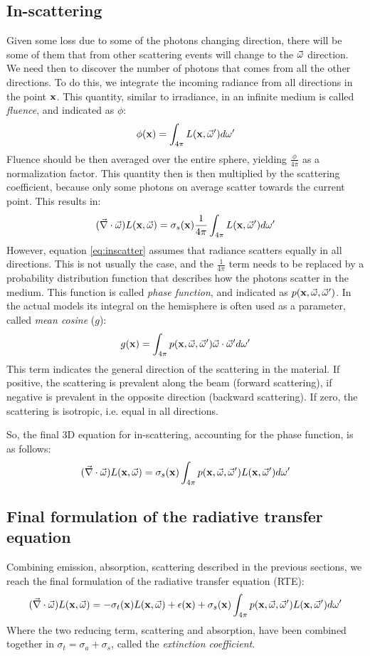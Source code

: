 \subsection{In-scattering}
Given some loss due to some of the photons changing direction, there will be some of them that from other scattering events will change to the $\vec{\omega}$ direction. We need then to discover the number of photons that comes from all the other directions. To do this, we integrate the incoming radiance from all directions in the point $\mathbf{x}$. This quantity, similar to irradiance, in an infinite medium is called \emph{fluence}, and indicated as $\phi$:
$$
\phi(\mathbf{x}) = \int_{4\pi} L(\mathbf{x},\vec{\omega}') d\omega'
$$
Fluence should be then averaged over the entire sphere, yielding $\frac{\phi}{4\pi}$ as a normalization factor. This quantity then is then multiplied by the scattering coefficient, because only some photons on average scatter towards the current point. This results in:
\begin{equation}
(\vec{\nabla} \cdot \vec{\omega}) L(\mathbf{x}, \vec{\omega}) = \sigma_s(\mathbf{x}) \frac{1}{4 \pi} \int_{4\pi} L(\mathbf{x},\vec{\omega}') d\omega'	
\label{eq:inscatter}
\end{equation}
However, equation \ref{eq:inscatter} assumes that radiance scatters equally in all directions. This is not usually the case, and the $\frac{1}{4 \pi}$ term needs to be replaced by a probability distribution function that describes how the photons scatter in the medium. This function is called \emph{phase function}, and indicated as $p(\mathbf{x}, \vec{\omega}, \vec{\omega}')$. In the actual models its integral on the hemisphere is often used as a parameter, called \emph{mean cosine} ($g$):
$$
g(\mathbf{x}) = \int_{4 \pi} p(\mathbf{x}, \vec{\omega}, \vec{\omega}') \vec{\omega} \cdot \vec{\omega}' d \omega'
$$
This term indicates the general direction of the scattering in the material. If positive, the scattering is prevalent along the beam (forward scattering), if negative is prevalent in the opposite direction (backward scattering). If zero, the scattering is isotropic, i.e. equal in all directions.

So, the final 3D equation for in-scattering, accounting for the phase function, is as follows:
\begin{equation*}
(\vec{\nabla} \cdot \vec{\omega}) L(\mathbf{x}, \vec{\omega}) = \sigma_s(\mathbf{x}) \int_{4\pi} p(\mathbf{x}, \vec{\omega}, \vec{\omega}') L(\mathbf{x},\vec{\omega}') d\omega'	
\end{equation*}

\subsection{Final formulation of the radiative transfer equation}
Combining emission, absorption, scattering described in the previous sections, we reach the final formulation of the radiative transfer equation (RTE):
\begin{equation}
(\vec{\nabla} \cdot \vec{\omega}) L(\mathbf{x}, \vec{\omega}) =   -\sigma_t(\mathbf{x}) L(\mathbf{x}, \vec{\omega}) + \epsilon(\mathbf{x}) + \sigma_s(\mathbf{x}) \int_{4\pi} p(\mathbf{x}, \vec{\omega}, \vec{\omega}') L(\mathbf{x},\vec{\omega}') d\omega'
\label{eq:rte}
\end{equation}
Where the two reducing term, scattering and absorption, have been combined together in $\sigma_t = \sigma_a + \sigma_s$, called the \emph{extinction coefficient}.


